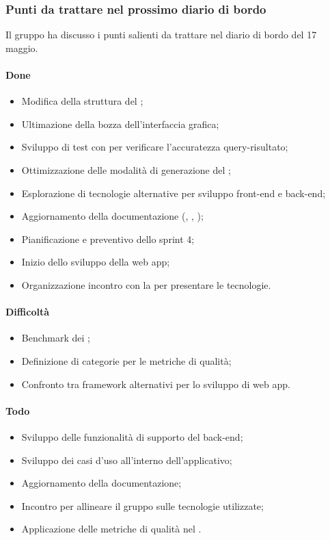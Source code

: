 \subsubsection{Punti da trattare nel prossimo diario di bordo}
\par Il gruppo ha discusso i punti salienti da trattare nel diario di bordo del 17 maggio.
\paragraph{Done}
\begin{itemize}
	\item Modifica della struttura del \PdP;
	\item Ultimazione della bozza dell'interfaccia grafica;
	\item Sviluppo di test con  per verificare l'accuratezza query-risultato;
	\item Ottimizzazione delle modalità di generazione del ;
	\item Esplorazione di tecnologie alternative per sviluppo front-end e back-end;
	\item Aggiornamento della documentazione (\PdQ, \NdP, \AdR);
	\item Pianificazione e preventivo dello sprint 4;
	\item Inizio dello sviluppo della web app;
	\item Organizzazione incontro con la  per presentare le tecnologie.
\end{itemize}

\paragraph{Difficoltà}
\begin{itemize}
	\item Benchmark dei ;
	\item Definizione di categorie per le metriche di qualità;
	\item Confronto tra framework alternativi per lo sviluppo di web app.
\end{itemize}

\paragraph{Todo}
\begin{itemize}
	\item Sviluppo delle funzionalità di supporto del back-end;
	\item Sviluppo dei casi d'uso all'interno dell'applicativo;
	\item Aggiornamento della documentazione;
	\item Incontro per allineare il gruppo sulle tecnologie utilizzate;
	\item Applicazione delle metriche di qualità nel \WoW.
\end{itemize}

